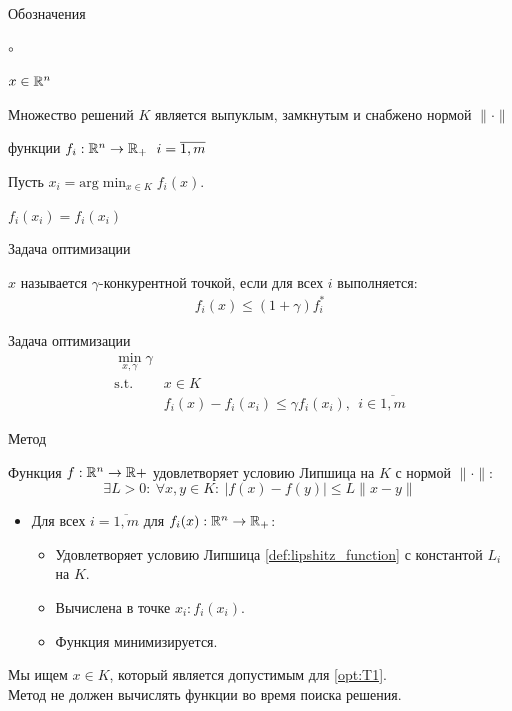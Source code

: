\documentclass{beamer}
\newcommand{\tvi}{f_i(x_i)}
\begin{document}
\begin{frame}{Обозначения}
\begin{list}{$\circ$}{}
    \item $x \in {\mathbb R}^n$
    \item Множество решений $K$ является выпуклым, замкнутым и снабжено нормой $\|\cdot\|$
    \item функции $f_i: {\mathbb R}^n \rightarrow {\mathbb R}_+ ~~ i = \overline{1, m}$
    \item Пусть $x_i = \text{arg}\min_{x \in K} f_i(x)$. 
    \item $f_i(x_i) = \tvi$
\end{list}
\end{frame}

\begin{frame}{Задача оптимизации}

\begin{definition}
$x$ называется $\gamma$-конкурентной точкой, если для всех $i$ выполняется:
\begin{align}
    f_i(x) \leq (1 + \gamma) f_i^*
\end{align}
\end{definition}

\begin{block}{Задача оптимизации}
    \begin{align*}
    \min_{x, \gamma} \gamma & \tag{$T_1$}\label{opt:T1} \\    
    \text{s.t.}~~ & x \in K \\
                 &f_i(x) - \tvi \leq  \gamma \tvi, ~~  i\in\overline{1, m}
    \end{align*}
\end{block}
 
\end{frame}

\begin{frame}{Метод}
\begin{definition}
\label{def:lipshitz_function}
    Функция $f : {\mathbb R}^n \rightarrow {\mathbb R}+$ удовлетворяет условию Липшица на $K$ с нормой $\|\cdot\|$:  
    $$
    \exists L > 0: ~ \forall x, y \in K:~  |f(x) - f(y) | \le L \|x -y\|
    $$
\end{definition}

\begin{itemize}
    \item Для всех $i = \overline{1, m}$ для $f_i(x):{\mathbb R}^n \rightarrow{\mathbb R}_+$:
        \begin{itemize}
            \item Удовлетворяет условию Липшица \ref{def:lipshitz_function} с константой $L_i$ на $K$.
            \item Вычислена в точке $x_i: \tvi$.
            \item Функция минимизируется.
        \end{itemize}
\end{itemize}
     Мы ищем $x \in K$, который является допустимым для \ref{opt:T1}. \\
     Метод не должен вычислять функции во время поиска решения.
\end{frame}
\end{document}
